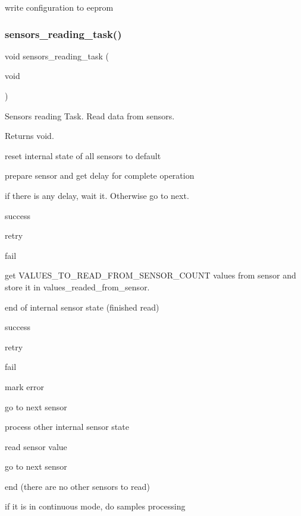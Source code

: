 write configuration to eeprom \mbox{\label{rmap_8ino_ad3efe51e17cb8205a24267c2992a12d4}} 
\subsubsection{\texorpdfstring{sensors\+\_\+reading\+\_\+task()}{sensors\_reading\_task()}}
{\footnotesize\ttfamily void sensors\+\_\+reading\+\_\+task (\begin{DoxyParamCaption}\item[{void}]{ }\end{DoxyParamCaption})}



Sensors reading Task. Read data from sensors. 

\begin{DoxyReturn}{Returns}
void. 
\end{DoxyReturn}
reset internal state of all sensors to default

prepare sensor and get delay for complete operation

if there is any delay, wait it. Otherwise go to next.

success

retry

fail

get V\+A\+L\+U\+E\+S\+\_\+\+T\+O\+\_\+\+R\+E\+A\+D\+\_\+\+F\+R\+O\+M\+\_\+\+S\+E\+N\+S\+O\+R\+\_\+\+C\+O\+U\+NT values from sensor and store it in values\+\_\+readed\+\_\+from\+\_\+sensor.

end of internal sensor state (finished read)

success

retry

fail

mark error

go to next sensor

process other internal sensor state

read sensor value

go to next sensor

end (there are no other sensors to read)

if it is in continuous mode, do samples processing \mbox{\label{rmap_8ino_a951e4934b8add405b8fe45417fc380f5}} 
